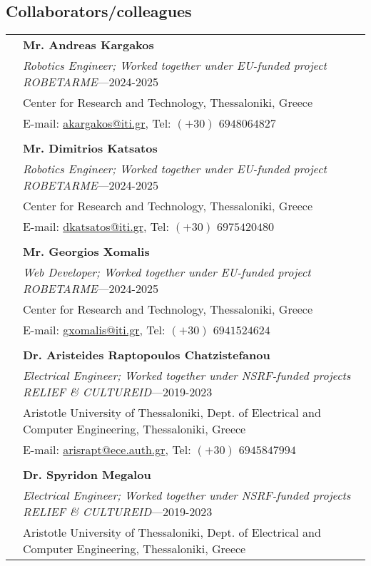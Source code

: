 \documentclass[a4paper,10pt,twoside]{article}
\begin{document}
\subsection*{Collaborators/colleagues}
\vspace{0.5cm}
\begin{tabular}{rp{14cm}}
& \textbf{Mr. Andreas Kargakos} \\
& \textit{Robotics Engineer; Worked together under EU-funded project ROBETARME}---2024-2025\\
& Center for Research and Technology, Thessaloniki, Greece \\
& E-mail: \href{mailto: akargakos@iti.gr}{akargakos@iti.gr}, Tel: $(+30)$ $694 806 4827$  \\
&\\
& \textbf{Mr. Dimitrios Katsatos} \\
& \textit{Robotics Engineer; Worked together under EU-funded project ROBETARME}---2024-2025\\
&Center for Research and Technology, Thessaloniki, Greece \\
& E-mail: \href{mailto: dkatsatos@iti.gr}{dkatsatos@iti.gr}, Tel: $(+30)$ $697 542 0480$ \\
&\\
& \textbf{Mr. Georgios Xomalis} \\
& \textit{Web Developer; Worked together under EU-funded project ROBETARME}---2024-2025\\
&Center for Research and Technology, Thessaloniki, Greece \\
& E-mail: \href{mailto: gxomalis@iti.gr}{gxomalis@iti.gr}, Tel: $(+30)$ $694 152 4624$ \\
&\\
& \textbf{Dr. Aristeides Raptopoulos Chatzistefanou} \\
& \textit{Electrical Engineer; Worked together under NSRF-funded projects RELIEF \& CULTUREID}---2019-2023\\
&Aristotle University of Thessaloniki, Dept. of Electrical and Computer Engineering, Thessaloniki, Greece \\
& E-mail: \href{mailto: arisrapt@ece.auth.gr}{arisrapt@ece.auth.gr}, Tel: $(+30)$ $694 584 7994$ \\
&\\
& \textbf{Dr. Spyridon Megalou} \\
& \textit{Electrical Engineer; Worked together under NSRF-funded projects RELIEF \& CULTUREID}---2019-2023\\
&Aristotle University of Thessaloniki, Dept. of Electrical and Computer Engineering, Thessaloniki, Greece \\

\end{tabular}
\end{document}

